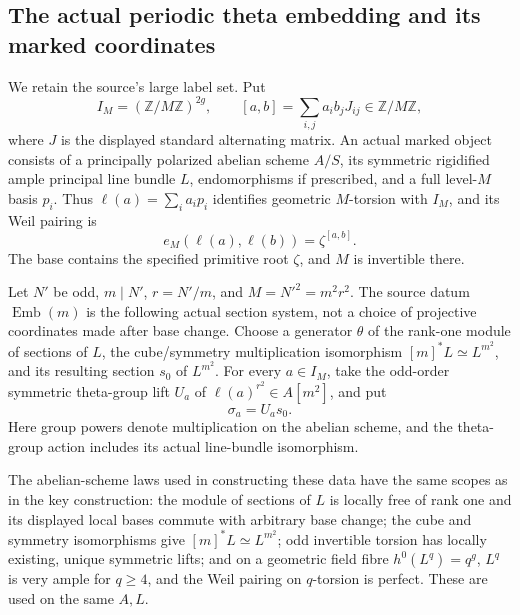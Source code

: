 \subsection{The actual periodic theta embedding and its marked coordinates}
\label{subsec:ftb-actual-theta-embedding}

We retain the source's large label set.  Put
\[
 I_M=(\mathbb Z/M\mathbb Z)^{2g},\qquad
 [a,b]=\sum_{i,j}a_ib_jJ_{ij}\in\mathbb Z/M\mathbb Z,
 \tag{TE1}\label{eq:ftb-theta-labels}
\]
where \(J\) is the displayed standard alternating matrix.
An actual marked object consists of a principally polarized
abelian scheme \(A/S\), its symmetric rigidified ample
principal line bundle \(L\), endomorphisms if prescribed,
and a full level-\(M\) basis \(p_i\).
Thus \(\ell(a)=\sum_i a_ip_i\) identifies geometric
\(M\)-torsion with \(I_M\), and its Weil pairing is
\[
                         e_M(\ell(a),\ell(b))=\zeta^{[a,b]}.
 \tag{TE2}\label{eq:ftb-labelled-weil}
\]
The base contains the specified primitive root \(\zeta\),
and \(M\) is invertible there.

Let \(N'\) be odd, \(m\mid N'\), \(r=N'/m\), and
\(M=N'^2=m^2r^2\).
The source datum \(\operatorname{Emb}(m)\) is the
following actual section system, not a choice of
projective coordinates made after base change.
Choose a generator \(\theta\) of the rank-one module
of sections of \(L\), the cube/symmetry multiplication
isomorphism \([m]^*L\simeq L^{m^2}\), and its resulting
section \(s_0\) of \(L^{m^2}\).
For every \(a\in I_M\), take the odd-order symmetric
theta-group lift \(U_a\) of
\(\ell(a)^{r^2}\in A[m^2]\), and put
\[
                                \sigma_a=U_a s_0.
 \tag{TE3}\label{eq:ftb-embedding-sections}
\]
Here group powers denote multiplication on the abelian
scheme, and the theta-group action includes its actual
line-bundle isomorphism.

The abelian-scheme laws used in constructing these data
have the same scopes as in the key construction:
the module of sections of \(L\) is locally free of rank
one and its displayed local bases commute with arbitrary
base change; the cube and symmetry isomorphisms give
\([m]^*L\simeq L^{m^2}\); odd invertible torsion has
locally existing, unique symmetric lifts; and on a
geometric field fibre \(h^0(L^q)=q^g\), \(L^q\) is very
ample for \(q\ge4\), and the Weil pairing on \(q\)-torsion
is perfect.
These are used on the same \(A,L\).

